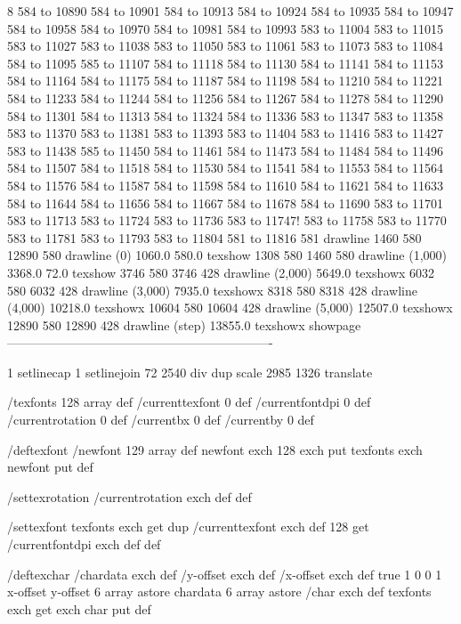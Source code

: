 8 584 to 10890 584 to 10901 584 to 10913 584 to 10924 584 to 10935 584 to 10947 584 to 10958 584 to 10970 584 to 10981 584 to 10993 583 to 11004 583 to 11015 583 to 11027 583 to 11038 583 to 11050 583 to 11061 583 to 11073 583 to 11084 584 to 11095 585 to 11107 584 to 11118 584 to 11130 584 to 11141 584 to 11153 584 to 11164 584 to 11175 584 to 11187 584 to 11198 584 to 11210 584 to 11221 584 to 11233 584 to 11244 584 to 11256 584 to 11267 584 to 11278 584 to 11290 584 to 11301 584 to 11313 584 to 11324 584 to 11336 583 to 11347 583 to 11358 583 to 11370 583 to 11381 583 to 11393 583 to 11404 583 to 11416 583 to 11427 583 to 11438 585 to 11450 584 to 11461 584 to 11473 584 to 11484 584 to 11496 584 to 11507 584 to 11518 584 to 11530 584 to 11541 584 to 11553 584 to 11564 584 to 11576 584 to 11587 584 to 11598 584 to 11610 584 to 11621 584 to 11633 584 to 11644 584 to 11656 584 to 11667 584 to 11678 584 to 11690 583 to 11701 583 to 11713 583 to 11724 583 to 11736 583 to 11747!
 583 to 11758 583 to 11770 583 to 
11781 583 to 11793 583 to 11804 581 to 11816 581 drawline
1460 580 12890 580 drawline
(0) 1060.0 580.0 texshow
1308 580 1460 580 drawline
(1,000) 3368.0 72.0 texshow
3746 580 3746 428 drawline
(2,000) 5649.0 texshowx
6032 580 6032 428 drawline
(3,000) 7935.0 texshowx
8318 580 8318 428 drawline
(4,000) 10218.0 texshowx
10604 580 10604 428 drawline
(5,000) 12507.0 texshowx
12890 580 12890 428 drawline
(step) 13855.0 texshowx
showpage
----------------------------------------------------------------

1 setlinecap 1 setlinejoin
72 2540 div dup scale
2985 1326 translate



/texfonts 128 array def
/currenttexfont 0 def
/currentfontdpi 0 def
/currentrotation 0 def
/currentbx 0 def
/currentby 0 def

/deftexfont
 { /newfont 129 array def
   newfont exch 128 exch put
   texfonts exch newfont put } def

/settexrotation
 { /currentrotation exch def } def

/settexfont
 { texfonts exch get dup /currenttexfont exch def
   128 get /currentfontdpi exch def } def

/deftexchar
 { /chardata exch def
   /y-offset exch def
   /x-offset exch def
   true
   1 0 0 1 x-offset y-offset 6 array astore
   chardata
   6 array astore /char exch def
   texfonts exch get exch char put } def

